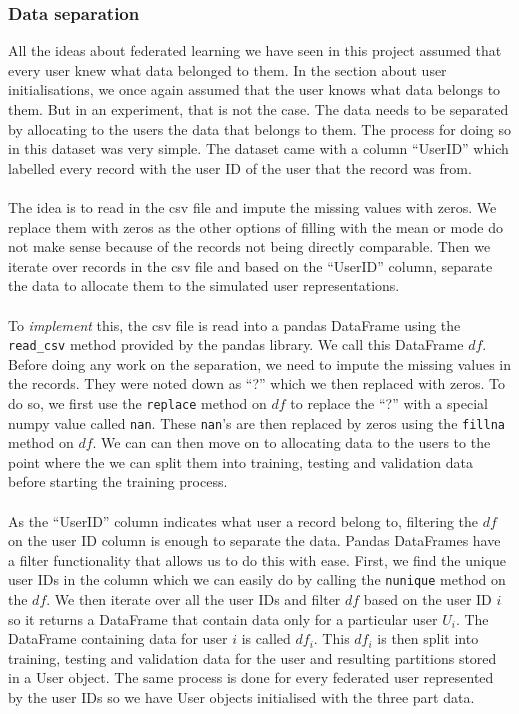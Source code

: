 \documentclass[12pt]{article}
\begin{document}
\subsubsection{Data separation}
All the ideas about federated learning we have seen in this project assumed that every user knew what data belonged to them. In the section about user initialisations, we once again assumed that the user knows what data belongs to them. But in an experiment, that is not the case. The data needs to be separated by allocating to the users the data that belongs to them. The process for doing so in this dataset was very simple. The dataset came with a column ``UserID'' which labelled every record with the user ID of the user that the record was from. 
\\\\
The idea is to read in the csv file and impute the missing values with zeros. We replace them with zeros as the other options of filling with the mean or mode do not make sense because of the records not being directly comparable. Then we iterate over records in the csv file and based on the ``UserID'' column, separate the data to allocate them to the simulated user representations. 
\\\\
To \textit{implement} this, the csv file is read into a pandas DataFrame using the \texttt{read\_csv} method provided by the pandas library. We call this DataFrame $df$. Before doing any work on the separation, we need to impute the missing values in the records. They were noted down as ``?'' which we then replaced with zeros. To do so, we first use the \texttt{replace} method on $df$ to replace the ``?'' with a special numpy value called \texttt{nan}. These \texttt{nan}'s are then replaced by zeros using the \texttt{fillna} method on $df$. We can can then move on to allocating data to the users to the point where the we can split them into training, testing and validation data before starting the training process.
\\\\
As the ``UserID'' column indicates what user a record belong to, filtering the $df$ on the user ID column is enough to separate the data. Pandas DataFrames have a filter functionality that allows us to do this with ease. First, we find the unique user IDs in the column which we can easily do by calling the \texttt{nunique} method on the $df$. We then iterate over all the user IDs and filter $df$ based on the user ID $i$ so it returns a DataFrame that contain data only for a particular user $U_i$. The DataFrame containing data for user $i$ is called $df_i$. This $df_i$ is then split into training, testing and validation data for the user and resulting partitions stored in a User object. The same process is done for every federated user represented by the user IDs so we have User objects initialised with the three part data. 
\end{document}
